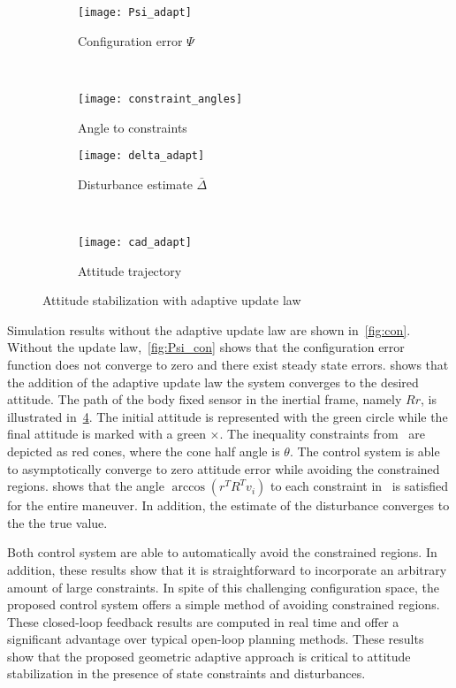 \documentclass[letterpaper, 10 pt, conference]{ieeeconf}  %
\begin{document}
\begin{figure} 
	\centering 
	\begin{subfigure}[htbp]{0.5\columnwidth} 
		\texttt{[image: Psi\_adapt]} 
		\caption{Configuration error \( \Psi \)} \label{fig:Psi_adapt} 
	\end{subfigure}~
	\begin{subfigure}[htbp]{0.5\columnwidth} 
		\texttt{[image: constraint\_angles]} 
		\caption{Angle to constraints} \label{fig:con_angles} 
	\end{subfigure}
	
	\centering
	\begin{subfigure}[htbp]{0.5\columnwidth} 
		\texttt{[image: delta\_adapt]} 
		\caption{Disturbance estimate \( \bar \Delta \)} \label{fig:delta_adapt} 
	\end{subfigure}~
	\begin{subfigure}[htbp]{0.5\columnwidth} 
		\texttt{[image: cad\_adapt]} 
		\caption{Attitude trajectory} \label{fig:cad_adapt} 
	\end{subfigure}
	\caption{Attitude stabilization with adaptive update law}
	\label{fig:adapt} 
\end{figure}

Simulation results without the adaptive update law are shown in~\cref{fig:con}.
Without the update law,~\cref{fig:Psi_con} shows that the configuration error function does not converge to zero and there exist steady state errors.
 shows that the addition of the adaptive update law the system converges to the desired attitude.
The path of the body fixed sensor in the inertial frame, namely \( R r \), is illustrated in~\cref{fig:cad_adapt}.
The initial attitude is represented with the green circle while the final attitude is marked with a green \(\times\).
The inequality constraints from~ are depicted as red cones, where the cone half angle is \( \theta \).
The control system is able to asymptotically converge to zero attitude error while avoiding the constrained regions.
 shows that the angle \( \arccos(r^T R^T v_i) \) to each constraint in~ is satisfied for the entire maneuver.
In addition, the estimate of the disturbance converges to the the true value.

Both control system are able to automatically avoid the constrained regions. 
In addition, these results show that it is straightforward to incorporate an arbitrary amount of large constraints.
In spite of this challenging configuration space, the proposed control system offers a simple method of avoiding constrained regions.
These closed-loop feedback results are computed in real time and offer a significant advantage over typical open-loop planning methods.
These results show that the proposed geometric adaptive approach is critical to attitude stabilization in the presence of state constraints and disturbances.
\end{document}
